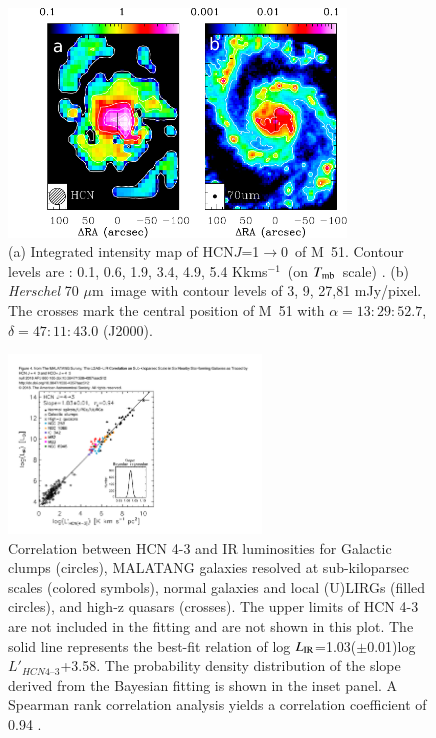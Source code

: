 \documentclass[legal,11pt]{article}
\def\kms    {\ifmmode{{\rm \ts km\ts s}^{-1}}\else{\ts km\ts s$^{-1}$}\fi}
\def\kms    {km\,s$^{-1}$\,}
\def\Kkms{K\,\kms }
\def\,{\thinspace}
\def\mum{$\mu$m}
\def\Tmb {$T_{\rm mb}$}
\def\LIR     {$L_{\rm IR}$}
\def\LHCNoz  {$L'_{\rm HCN\, J=1-0}$}
\def\HCNoz      {HCN\,$J$=1$\rightarrow$0}
\begin{document}
\begin{figure}
\centering
\includegraphics[width=0.8\textwidth]{M51_IR_HCN.pdf}

\caption{
(a) Integrated intensity map of \HCNoz\ of M~51. Contour levels are :        0.1, 0.6, 1.9, 3.4, 4.9, 5.4  \Kkms\ (on \Tmb\ scale) . (b) {\it Herschel} 70        \mum\ image with contour levels of 3, 9, 27,81 mJy/pixel.  The crosses        mark the central position of M~51 with $\alpha= 13:29:52.7$, $\delta=        47:11:43.0$ (J2000).} \label{fig:M51_IR_HCN}
\end{figure}

\begin{figure}
\centering
\includegraphics[width=0.6\textwidth]{Tan_relation.pdf}
\caption{
Correlation between HCN 4-3 and IR luminosities for Galactic
clumps (circles), MALATANG galaxies resolved at sub-kiloparsec scales (colored
symbols), normal galaxies and local (U)LIRGs (filled circles), and high-z quasars
(crosses). The upper limits of HCN 4-3 are not included in the fitting and
are not shown in this plot. The solid line represents the best-fit relation of
log \LIR=1.03($\pm$0.01)log $L'_{HCN 4–3}$+3.58. The probability density distribution
of the slope derived from the Bayesian fitting is shown in the inset panel. A
Spearman rank correlation analysis yields a correlation coefficient of 0.94  \citep{Tan:2018}.
} \label{fig:tan_relation}
\end{figure}
\end{document}
